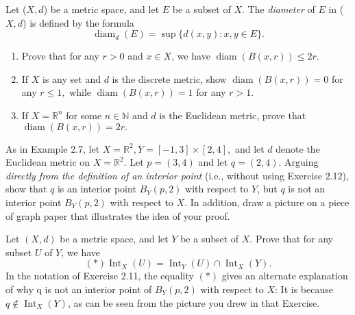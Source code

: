 \documentclass[12pt,letterpaper,boxed]{hmcpset}
\DeclareMathOperator{\diam}{diam}
\DeclareMathOperator{\Int}{Int}
\begin{document}
\begin{problem}[Exercise 2.8.]
Let ($X, d$) be a metric space, and let $E$ be a subset of $X$. The \textit{diameter} of $E$ in ($X,d$) is defined by the formula $$\diam_{d}(E) = \sup\{d(x,y) : x,y \in E\}.$$

\vspace{-2mm}
\begin{enumerate}
	\itemsep0em
	\item Prove that for any $r > 0$ and $x \in X$, we have $\diam(B(x,r))\leq 2r.$
	\item If $X$ is any set and $d$ is the discrete metric, show $\diam(B(x, r)) = 0$ for any $r \leq 1,$ while $\diam(B(x,r)) = 1$ for any $r > 1$.
	\item If $X = \mathbb{R}^{n}$ for some $n \in \mathbb{N}$ and $d$ is the Euclidean metric, prove that $\diam(B(x,r)) = 2r.$ 
\end{enumerate}

\end{problem}
\begin{solution}

\end{solution}

\begin{problem}[Exercise 2.11.]
As in Example 2.7, let $X = \mathbb{R}^{2}, Y = [-1,3]\times[2,4],$ and let $d$ denote the Euclidean metric on $X = \mathbb{R}^{2}.$ Let $p = (3,4)$ and let $q = (2, 4)$. Arguing \textit{directly from the definition of an interior point} (i.e., without using Exercise 2.12), show that $q$ is an interior point $B_{Y}(p,2)$ with respect to $Y$, but $q$ is not an interior point $B_{Y}(p,2)$ with respect to $X$. In addition, draw a picture on a piece of graph paper that illustrates the idea of your proof.
\end{problem}
\begin{solution}

\end{solution}


\begin{problem}[Exercise 2.12.]
Let $(X, d)$ be a metric space, and let $Y$ be a subset of $X$. Prove that for any subset $U$ of $Y$, we have $$(*) \Int_{X}(U) = \Int_{Y}(U)\cap\Int_{X}(Y).$$
In the notation of Exercise 2.11, the equality $(*)$ gives an alternate explanation of why q is not an interior point of $B_{Y}(p, 2)$ with respect to $X$: It is because $q \notin \Int_{X}(Y)$, as can be seen from the picture you drew in that Exercise.
\end{problem}
\begin{solution}

\end{solution}
\end{document}
